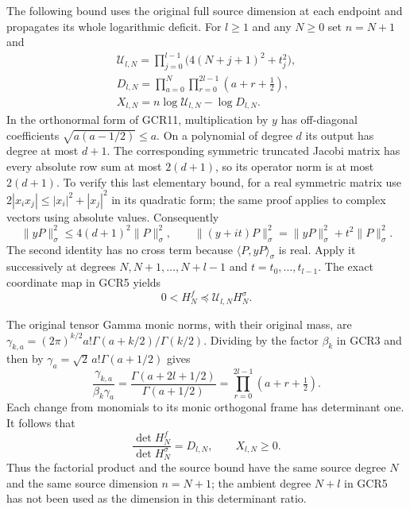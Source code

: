 \documentclass[11pt,a4paper]{article}
\begin{document}
The following bound uses the original full source dimension at
each endpoint and propagates its whole logarithmic deficit.
For $l\geq1$ and any $N\geq0$ set $n=N+1$ and
\[
\begin{gathered}
 \mathscr U_{l,N}
    =\prod_{j=0}^{l-1}\bigl(4(N+j+1)^2+t_j^2\bigr),\\
 D_{l,N}
    =\prod_{a=0}^{N}\prod_{r=0}^{2l-1}(a+r+\tfrac12),\\
 X_{l,N}=n\log\mathscr U_{l,N}-\log D_{l,N}.
\end{gathered}\tag{GCR28}
\]
In the orthonormal form of GCR11, multiplication by $y$ has
off-diagonal coefficients $\sqrt{a(a-1/2)}\leq a$.
On a polynomial of degree $d$ its output has degree at most
$d+1$. The corresponding symmetric truncated Jacobi matrix
has every absolute row sum at most $2(d+1)$, so its operator
norm is at most $2(d+1)$. To verify this last elementary bound,
for a real symmetric matrix use
$2|x_i x_j|\leq |x_i|^2+|x_j|^2$ in its quadratic form;
the same proof applies to complex vectors using absolute values.
Consequently
\[
 \|yP\|_\sigma^2\leq4(d+1)^2\|P\|_\sigma^2,\qquad
 \|(y+it)P\|_\sigma^2
      =\|yP\|_\sigma^2+t^2\|P\|_\sigma^2.
\]
The second identity has no cross term because
$\langle P,yP\rangle_\sigma$ is real. Apply it successively
at degrees $N,N+1,\ldots,N+l-1$ and $t=t_0,\ldots,t_{l-1}$.
The exact coordinate map in GCR5 yields
\[
 0<H_N^f\preceq\mathscr U_{l,N}H_N^\sigma .
\tag{GCR29}
\]

The original tensor Gamma monic norms, with their original mass,
are
$\gamma_{k,a}=(2\pi)^{k/2}a!\Gamma(a+k/2)/\Gamma(k/2)$.
Dividing by the factor $\beta_k$ in GCR3 and then by
$\gamma_a=\sqrt2\,a!\Gamma(a+1/2)$ gives
\[
 \frac{\gamma_{k,a}}{\beta_k\gamma_a}
     =\frac{\Gamma(a+2l+1/2)}{\Gamma(a+1/2)}
     =\prod_{r=0}^{2l-1}(a+r+\tfrac12).
\]
Each change from monomials to its monic orthogonal frame has
determinant one. It follows that
\[
 \frac{\det H_N^f}{\det H_N^\sigma}=D_{l,N},\qquad
 X_{l,N}\geq0.
\tag{GCR30}
\]
Thus the factorial product and the source bound have the same
source degree $N$ and the same source dimension $n=N+1$;
the ambient degree $N+l$ in GCR5 has not been used as the
dimension in this determinant ratio.
\end{document}
